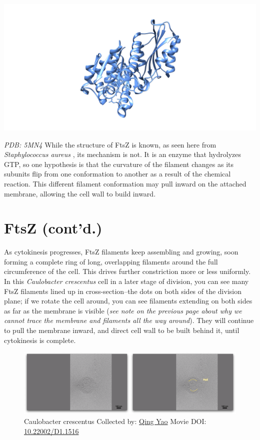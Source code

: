 \documentclass[]{tufte-book}
\begin{document}
\includegraphics{img/schematics/5_9_1}

\emph{PDB: 5MN4} While the structure of FtsZ is known, as seen here from
\emph{Staphylococcus aureus} \citep{wagstaff2017}, its mechanism is not.
It is an enzyme that hydrolyzes GTP, so one hypothesis is that the
curvature of the filament changes as its subunits flip from one
conformation to another as a result of the chemical reaction. This
different filament conformation may pull inward on the attached
membrane, allowing the cell wall to build inward.

\section{FtsZ (cont'd.)}\label{ftsz-contd.}

As cytokinesis progresses, FtsZ filaments keep assembling and growing,
soon forming a complete ring of long, overlapping filaments around the
full circumference of the cell. This drives further constriction more or
less uniformly. In this \emph{Caulobacter crescentus} cell in a later
stage of division, you can see many FtsZ filaments lined up in
cross-section--the dots on both sides of the division plane; if we
rotate the cell around, you can see filaments extending on both sides as
far as the membrane is visible (\emph{see note on the previous page
about why we cannot trace the membrane and filaments all the way
around}). They will continue to pull the membrane inward, and direct
cell wall to be built behind it, until cytokinesis is complete.





\begin{figure}
\includegraphics{movie_stills/5_10} \caption[Caulobacter crescentus Collected by:
\protect\hyperlink{qing_yao}{Qing Yao} Movie DOI:
\href{https://doi.org/10.22002/D1.1516}{10.22002/D1.1516}]{Caulobacter crescentus Collected by:
\protect\hyperlink{qing_yao}{Qing Yao} Movie DOI:
\href{https://doi.org/10.22002/D1.1516}{10.22002/D1.1516}}\label{fig:5-10}
\end{figure}
\end{document}
